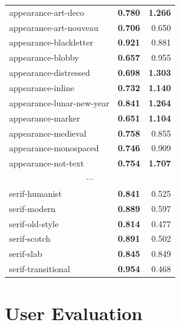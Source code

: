 \begin{longtable}{|l|r|r|}
appearance-art-deco       & \textbf{0.780}             & \textbf{1.266}          \\
appearance-art-nouveau    & \textbf{0.706}             & 0.650                   \\
appearance-blackletter    & \textbf{0.921}             & 0.881                   \\
appearance-blobby         & \textbf{0.657}             & 0.955                   \\
appearance-distressed     & \textbf{0.698}             & \textbf{1.303}          \\
appearance-inline         & \textbf{0.732}             & \textbf{1.140}          \\
appearance-lunar-new-year & \textbf{0.841}             & \textbf{1.264}          \\
appearance-marker         & \textbf{0.651}             & \textbf{1.104}          \\
appearance-medieval       & \textbf{0.758}             & 0.855                   \\
appearance-monospaced     & \textbf{0.746}             & 0.909                   \\
appearance-not-text       & \textbf{0.754}             & \textbf{1.707}          \\
\hline
\multicolumn{3}{|c|}{$\cdots$} \\
\hline
serif-humanist            & \textbf{0.841}             & 0.525                   \\
serif-modern              & \textbf{0.889}             & 0.597                   \\
serif-old-style           & \textbf{0.814}             & 0.477                   \\
serif-scotch              & \textbf{0.891}             & 0.502                   \\
serif-slab                & \textbf{0.845}             & 0.849                   \\
serif-transitional        & \textbf{0.954}             & 0.468              

\end{longtable}

\section{User Evaluation} \label{user-eval}

